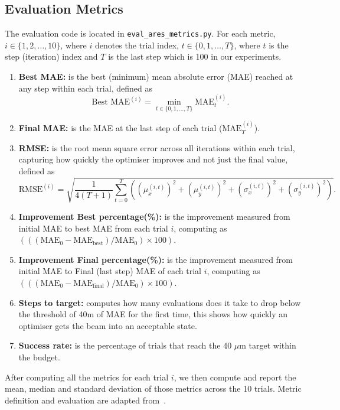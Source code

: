 \subsection{Evaluation Metrics}
The evaluation code is located in \texttt{eval\_ares\_metrics.py}. 
For each metric, $i \in \{1,2,\ldots,10\}$, where $i$ denotes the trial index, $t \in \{0,1,\ldots,T\}$, where $t$ is the step (iteration) index and $T$ is the last step which is 100 in our experiments.
\begin{enumerate}
    \item \textbf{Best MAE:} is the best (minimum) mean absolute error (MAE) reached at any step within each trial, defined as 
    \begin{equation}
        \text{Best MAE}^{(i)} = \min_{t \in \{0, 1, \ldots, T\}} \text{MAE}_t^{(i)}.
    \end{equation}
    \item \textbf{Final MAE:} is the MAE at the last step of each trial ($\text{MAE}_T^{(i)}$).
    \item \textbf{RMSE:} is the root mean square error across all iterations within each trial, capturing how quickly the optimiser improves and not just the final value, defined as
    \begin{equation}
        \text{RMSE}^{(i)} = \sqrt{\frac{1}{4(T+1)} \sum_{t=0}^{T} \left( (\mu_x^{(i,t)})^2 + (\mu_y^{(i,t)})^2 + (\sigma_x^{(i,t)})^2 + (\sigma_y^{(i,t)})^2 \right)}.
    \end{equation}
    \item \textbf{Improvement Best percentage(\%):} is the improvement measured from initial MAE to best MAE from each trial $i$, computing as $(((\text{MAE}_0 - \text{MAE}_{\text{best}})/\text{MAE}_0) \times 100)$.
    \item \textbf{Improvement Final percentage(\%):} is the improvement measured from initial MAE to Final (last step) MAE of each trial $i$, computing as $(((\text{MAE}_0 - \text{MAE}_{\text{final}})/\text{MAE}_0) \times 100)$.

    \item \textbf{Steps to target:} computes how many evaluations does it take to drop below the threshold of \SI{40}{\mu}m of MAE for the first time, this shows how quickly an optimiser gets the beam into an acceptable state.
    \item \textbf{Success rate:} is the percentage of trials that reach the 40 $\mu$m target within the budget.
\end{enumerate}

After computing all the metrics for each trial $i$, we then compute and report the mean, median and standard deviation of those metrics across the 10 trials.
Metric definition and evaluation are adapted from~\cite{kaiser2024bridging, kaiser2024rl}.